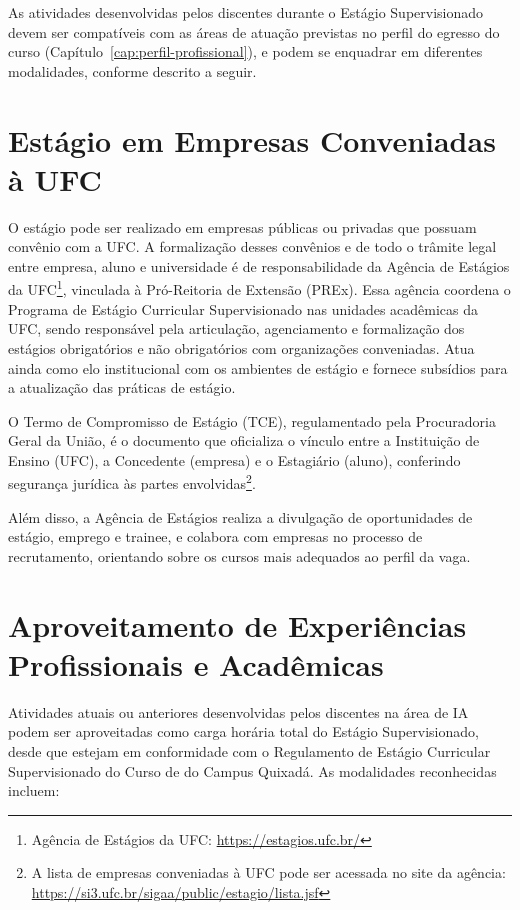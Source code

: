 As atividades desenvolvidas pelos discentes durante o Estágio Supervisionado devem ser compatíveis com as áreas de atuação previstas no perfil do egresso do curso (Capítulo~\ref{cap:perfil-profissional}), e podem se enquadrar em diferentes modalidades, conforme descrito a seguir.

\section{Estágio em Empresas Conveniadas à UFC}

O estágio pode ser realizado em empresas públicas ou privadas que possuam convênio com a UFC. A formalização desses convênios e de todo o trâmite legal entre empresa, aluno e universidade é de responsabilidade da Agência de Estágios da UFC\footnote{Agência de Estágios da UFC: \url{https://estagios.ufc.br/}}, vinculada à Pró-Reitoria de Extensão (PREx). Essa agência coordena o Programa de Estágio Curricular Supervisionado nas unidades acadêmicas da UFC, sendo responsável pela articulação, agenciamento e formalização dos estágios obrigatórios e não obrigatórios com organizações conveniadas. Atua ainda como elo institucional com os ambientes de estágio e fornece subsídios para a atualização das práticas de estágio.

O Termo de Compromisso de Estágio (TCE), regulamentado pela Procuradoria Geral da União, é o documento que oficializa o vínculo entre a Instituição de Ensino (UFC), a Concedente (empresa) e o Estagiário (aluno), conferindo segurança jurídica às partes envolvidas\footnote{A lista de empresas conveniadas à UFC pode ser acessada no site da agência: \url{https://si3.ufc.br/sigaa/public/estagio/lista.jsf}}.

Além disso, a Agência de Estágios realiza a divulgação de oportunidades de estágio, emprego e trainee, e colabora com empresas no processo de recrutamento, orientando sobre os cursos mais adequados ao perfil da vaga.

\section{Aproveitamento de Experiências Profissionais e Acadêmicas}

Atividades atuais ou anteriores desenvolvidas pelos discentes na área de IA podem ser aproveitadas como carga horária total do Estágio Supervisionado, desde que estejam em conformidade com o Regulamento de Estágio Curricular Supervisionado do Curso de \nomedocurso do Campus Quixadá. As modalidades reconhecidas incluem:

